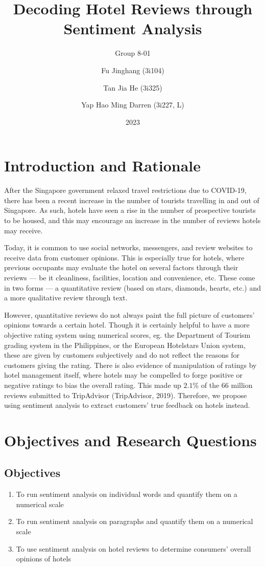 \documentclass[12pt]{scrartcl}
\title{Decoding Hotel Reviews through Sentiment Analysis}
\subtitle{Group 8-01}
\author{
	Fu Jinghang (3i104) \and
	Tan Jia He (3i325) \and
	Yap Hao Ming Darren (3i227, L)
}
\date{2023}
\begin{document}
\pagestyle{scrheadings}

\maketitle
\tableofcontents
\pagebreak

\section{Introduction and Rationale}
After the Singapore government relaxed travel restrictions due to COVID-19,
there has been a recent increase in the number of tourists travelling in and out of Singapore.
As such, hotels have seen a rise in the number of prospective tourists to be housed,
and this may encourage an increase in the number of reviews hotels may receive.

Today, it is common to use social networks, messengers, and review websites
to receive data from customer opinions. This is especially true for hotels,
where previous occupants may evaluate the hotel on several factors through their
reviews --- be it cleanliness, facilities, location and convenience, etc.
These come in two forms --- a quantitative review (based on stars, diamonds, hearts, etc.)
and a more qualitative review through text.

However, quantitative reviews do not always paint the full picture of customers'
opinions towards a certain hotel. Though it is certainly helpful to have a more
objective rating system using numerical scores, eg. the Department of Tourism grading system in
the Philippines, or the European Hotelstars Union system,
these are given by customers subjectively and do not reflect the reasons for customers giving the rating.
There is also evidence of manipulation of ratings by hotel management itself, where hotels may be
compelled to forge positive or negative ratings to bias the overall rating.
This made up $2.1\%$ of the $66$ million reviews submitted to TripAdvisor (TripAdvisor, 2019). %
Therefore, we propose using sentiment analysis to extract customers' true feedback on hotels instead.

\section{Objectives and Research Questions}
\subsection{Objectives}
\begin{enumerate}
	\item To run sentiment analysis on individual words and quantify them on a numerical scale
	\item To run sentiment analysis on paragraphs and quantify them on a numerical scale
	\item To use sentiment analysis on hotel reviews to determine consumers' overall opinions of hotels
\end{enumerate}
\end{document}
